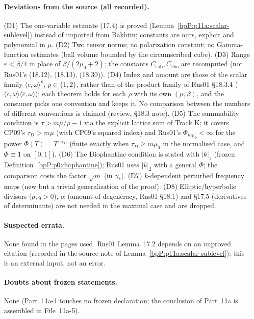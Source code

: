 \paragraph{Deviations from the source (all recorded).} (D1) The one-variable estimate (17.4) is proved (Lemma~\ref{bpP:p11a:scalar-sublevel}) instead of imported from Bakhtin; constants are ours, explicit and polynomial in $\mu$. (D2) Two tensor norms; no polarization constant; no Gamma-function estimates (ball volume bounded by the circumscribed cube). (D3) Range $\varepsilon<\beta/4$ in place of $\beta/(2\mu_0+2)$; the constants $C_{\mathrm{sub}},C_{\mathrm{Dio}}$ are recomputed (not Rus01's (18.12), (18.13), (18.30)). (D4) Index and amount are those of the scalar family $\langle c,\omega\rangle^\rho$, $\rho\in\{1,2\}$, rather than of the product family of Rus01 \S18.3.4 ($\langle c,\omega\rangle\langle\hat c,\omega\rangle$); each theorem holds for each $\rho$ with its own $(\mu,\beta)$, and the consumer picks one convention and keeps it. No comparison between the numbers of different conventions is claimed (review, \S18.3 note). (D5) The summability condition is $\tau>m\mu/\rho-1$ via the explicit lattice sum of Track K; it covers CP09's $\tau_D>m\mu$ (with CP09's squared index) and Rus01's $\Phi_{m\mu_0}<\infty$ for the power $\Phi(T)=T^{-\tau_D}$ (finite exactly when $\tau_D\ge m\mu_0$ in the normalised case, and $\Phi\equiv1$ on $[0,1]$). (D6) The Diophantine condition is stated with $\lvert k\rvert_1$ (frozen Definition~\ref{bpP:p0:diophantine}); Rus01 uses $\lvert k\rvert_2$ with a general $\Phi$; the comparison costs the factor $\sqrt m$ (in $\gamma_*$). (D7) $k$-dependent perturbed frequency maps (new but a trivial generalisation of the proof). (D8) Elliptic/hyperbolic divisors ($p,q>0$), $\alpha$ (amount of degeneracy, Rus01 \S18.1) and \S17.5 (derivatives of determinants) are not needed in the maximal case and are dropped.

\paragraph{Suspected errata.} None found in the pages used. Rus01 Lemma~17.2 depends on an unproved citation (recorded in the source note of Lemma~\ref{bpP:p11a:scalar-sublevel}); this is an external input, not an error.

\paragraph{Doubts about frozen statements.} None (Part~11a-1 touches no frozen declaration; the conclusion of Part~11a is assembled in File~11a-5).

